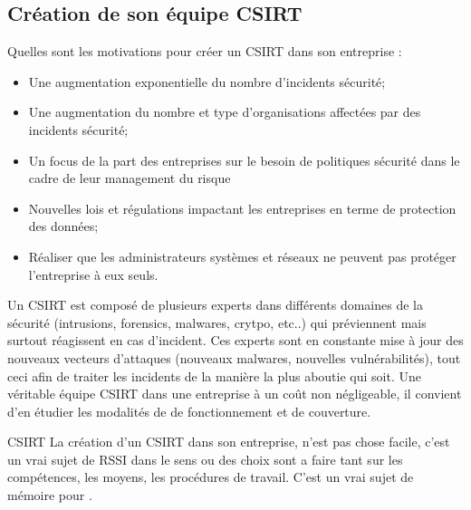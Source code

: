\subsection{Création de son équipe CSIRT}

Quelles sont les motivations pour créer un CSIRT dans son entreprise : 

\begin{itemize}
  \item Une augmentation exponentielle du nombre d’incidents sécurité;
  \item Une augmentation du nombre et type d’organisations affectées par des incidents sécurité;
  \item Un focus de la part des entreprises sur le besoin de politiques sécurité dans le cadre de leur management du risque
  \item Nouvelles lois et régulations impactant les entreprises en terme de protection des données;
  \item Réaliser que les administrateurs systèmes et réseaux ne peuvent pas protéger l’entreprise à eux seuls.
\end{itemize}

Un CSIRT est composé de plusieurs experts dans différents domaines de la sécurité (intrusions, forensics, malwares, crytpo, etc..) qui préviennent mais surtout réagissent en cas d’incident. Ces experts sont en constante mise à jour des nouveaux vecteurs d’attaques (nouveaux malwares, nouvelles vulnérabilités), tout ceci afin de traiter les incidents de la manière la plus aboutie qui soit. Une véritable équipe CSIRT dans une entreprise à un coût non négligeable, il convient d'en étudier les modalités de de fonctionnement et de couverture.


\begin{techworkbox}{CSIRT}
La création d'un CSIRT dans son entreprise, n'est pas chose facile, c'est un vrai sujet de RSSI dans le sens ou des choix sont a faire tant sur les compétences, les moyens, les procédures de travail. C'est un vrai sujet de mémoire pour \fichetech.
\end{techworkbox}

